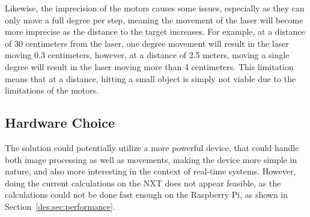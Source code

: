 Likewise, the imprecision of the motors causes some issues, especially as they can only move a full degree per step, meaning the movement of the laser will become more imprecise as the distance to the target increases.
For example, at a distance of 30 centimeters from the laser, one degree movement will result in the laser moving 0.3 centimeters, however, at a distance of 2.5 meters, moving a single degree will result in the laser moving more than 4 centimeters.
This limitation means that at a distance, hitting a small object is simply not viable due to the limitations of the motors.

\subsection{Hardware Choice}
The solution could potentially utilize a more powerful device, that could handle both image processing as well as movements, making the device more simple in nature, and also more interesting in the context of real-time systems.
However, doing the current calculations on the NXT does not appear feasible, as the calculations could not be done fast enough on the Raspberry Pi, as shown in Section~\ref{des:sec:performance}.
 
